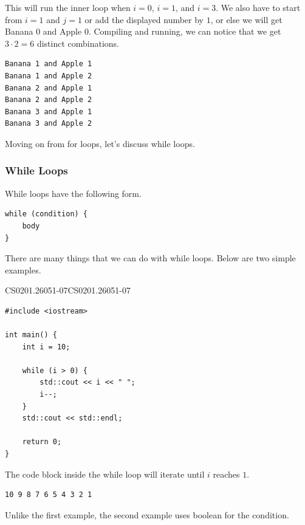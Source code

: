 \documentclass[../../main.tex]{subfiles}
\begin{document}
This will run the inner loop when $i = 0$, $i = 1$, and $i = 3$.
We also have to start from $i = 1$ and $j = 1$ or add the
displayed number by $1$, or else we will get Banana $0$ and
Apple $0$. Compiling and running, we can notice that we get
$3 \cdot 2 = 6$ distinct combinations.

\begin{outputbox}
\begin{lstlisting}[style=basic]
Banana 1 and Apple 1
Banana 1 and Apple 2
Banana 2 and Apple 1
Banana 2 and Apple 2
Banana 3 and Apple 1
Banana 3 and Apple 2
\end{lstlisting}
\end{outputbox}

Moving on from for loops, let's discuss while loops.

\subsubsection{While Loops}

While loops have the following form.

\begin{basicbox}
\begin{lstlisting}[style=basic]
while (condition) {
    body
}
\end{lstlisting}
\end{basicbox}

There are many things that we can do with while loops. Below are
two simple examples.

\begin{cppbox}{CS0201.26051-07}{CS0201.26051-07}
\begin{lstlisting}[style=cppstyle]
#include <iostream>

int main() {
    int i = 10;

    while (i > 0) {
        std::cout << i << " ";
        i--;
    }
    std::cout << std::endl;

    return 0;
}
\end{lstlisting}
\end{cppbox}

The code block inside the while loop will iterate until $i$ reaches
$1$.

\begin{outputbox}
\begin{lstlisting}[style=basic]
10 9 8 7 6 5 4 3 2 1
\end{lstlisting}
\end{outputbox}

Unlike the first example, the second example uses boolean for the
condition.
\end{document}
